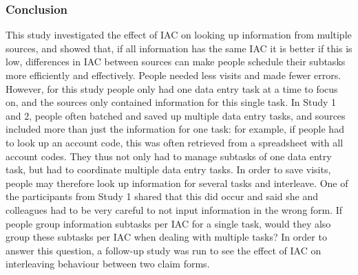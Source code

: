 
%

\subsubsection{Conclusion}
This study investigated the effect of IAC on looking up information from multiple sources, and showed that, if all information has the same IAC it is better if this is low, differences in IAC between sources can make people schedule their subtasks more efficiently and effectively. People needed less visits and made fewer errors. 
However, for this study people only had one data entry task at a time to focus on, and the sources only contained information for this single task. In Study 1 and 2, people often batched and saved up multiple data entry tasks, and sources included more than just the information for one task: for example, if people had to look up an account code, this was often retrieved from a spreadsheet with all account codes. They thus not only had to manage subtasks of one data entry task, but had to coordinate multiple data entry tasks. In order to save visits, people may therefore look up information for several tasks and interleave. One of the participants from Study 1 shared that this did occur and said she and colleagues had to be very careful to not input information in the wrong form. If people group information subtasks per IAC for a single task, would they also group these subtasks per IAC when dealing with multiple tasks? In order to answer this question, a follow-up study was run to see the effect of IAC on interleaving behaviour between two claim forms. 


